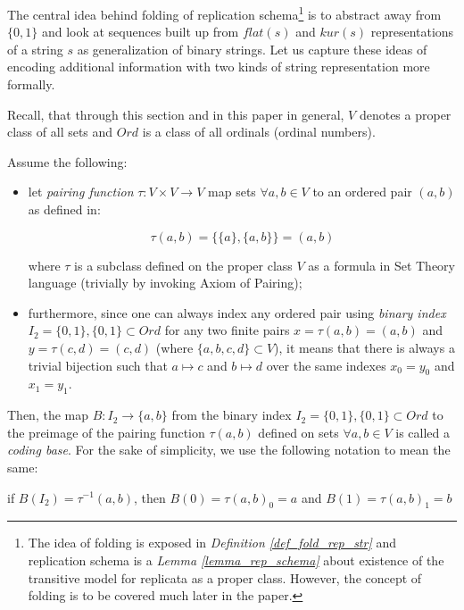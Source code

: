 The central idea behind folding of replication schema\footnote{The idea of folding is exposed in \textit{Definition \ref{def_fold_rep_str}} and replication schema is a \textit{Lemma \ref{lemma_rep_schema}} about existence of the transitive model for replicata as a proper class. However, the concept of folding is to be covered much later in the paper.} is to abstract away from $\{0,1\}$ and look at sequences built up from $flat(s)$ and $kur(s)$ representations of a string $s$ as generalization of binary strings. Let us capture these ideas of encoding additional information with two kinds of string representation more formally.

Recall, that through this section and in this paper in general, $V$ denotes a proper class of all sets and $Ord$ is a class of all ordinals (ordinal numbers).

\begin{definition}\label{def_coding_base}
    Assume the following:
    \begin{itemize}
        \item let \textit{pairing function} $\tau: V \times V \to V$ map sets $\forall a, b \in V$ to an ordered pair $(a, b)$ as defined in: 
        
            \[\tau(a, b) = \{\{a\}, \{a, b\}\} = (a, b) \]

        where $\tau$ is a subclass defined on the proper class $V$ as a formula in Set Theory language (trivially by invoking Axiom of Pairing);
        \item furthermore, since one can always index any ordered pair using \textit{binary index} $I_2 = \{ 0, 1\}, \{0,1\} \subset Ord$ for any two finite pairs $x = \tau(a, b) = (a, b)$ and $y = \tau(c, d) = (c, d)$ (where $\{a,b,c,d\} \subset V$), it means that there is always a trivial bijection such that $a \mapsto c$ and $b \mapsto d$ over the same indexes $x_0 = y_0$ and $x_1 = y_1$.
    \end{itemize}
    Then, the map $B: I_2 \to \{a, b\}$ from the binary index $I_2 = \{ 0, 1\}, \{0,1\} \subset Ord$ to the preimage of the pairing function $\tau(a, b)$ defined on sets $\forall a, b \in V$ is called a \textit{coding base}. For the sake of simplicity, we use the following notation to mean the same:
    \begin{center}
        if \( B(I_2) = \tau^{-1}(a, b) \), then \( B(0) = \tau(a, b)_{0} = a \) and \( B(1) = \tau(a, b)_{1} = b \)
    \end{center}
\end{definition}

